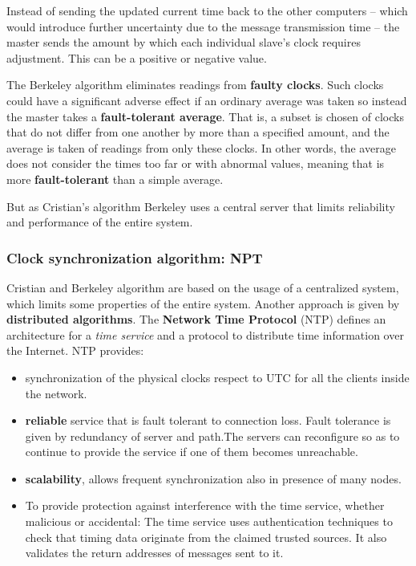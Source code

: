 \documentclass[11pt,a4paper]{article}
\begin{document}
Instead of sending the updated current time back to the other computers – which would introduce further uncertainty due to the message transmission time – the master sends the amount by which each individual slave’s clock requires adjustment. This can be a positive or negative value.

The Berkeley algorithm eliminates readings from \textbf{faulty clocks}. Such clocks could have a significant adverse effect if an ordinary average was taken so instead the master takes a \textbf{fault-tolerant average}. That is, a subset is chosen of clocks that do not differ from one another by more than a specified amount, and the average is taken of readings from only these clocks. In other words, the average does not consider the times too far or with abnormal values, meaning that is more \textbf{fault-tolerant} than a simple average. 

But as Cristian's algorithm Berkeley uses a central server that limits reliability and performance of the entire system.

\subsubsection{Clock synchronization algorithm: NPT}
Cristian and Berkeley algorithm are based on the usage of a centralized system, which limits some properties of the entire system. Another approach is given by \textbf{distributed algorithms}.
The \textbf{Network Time Protocol} (NTP) defines an architecture for a \textit{time service} and a protocol to distribute time information over the Internet. NTP provides:
\begin{itemize}
	\item synchronization of the physical clocks respect to UTC for all the clients inside the network.
	\item \textbf{reliable} service that is fault tolerant to connection loss. Fault tolerance is given by redundancy of server and path.The servers can reconfigure so as to continue to provide the service if one of them becomes unreachable.
	\item \textbf{scalability}, allows frequent synchronization also in presence of many nodes.
	\item To provide protection against interference with the time service, whether malicious or accidental: The time service uses authentication techniques to check that timing data originate from the claimed trusted sources. It also validates the return addresses of messages sent to it.
\end{itemize}
\end{document}
